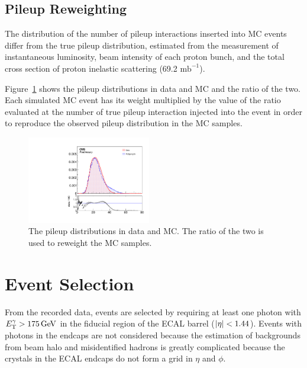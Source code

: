 

\subsection{Pileup Reweighting}
\label{sec:puweight}

The distribution of the number of pileup interactions inserted into MC events differ from the true pileup distribution, estimated from the measurement of instantaneous luminosity, beam intensity of each proton bunch, and the total cross section of proton inelastic scattering (69.2 $\textrm{mb}^{-1}$). 

Figure~\ref{fig:pudist} shows the pileup distributions in data and MC and the ratio of the two. 
Each simulated MC event has its weight multiplied by the value of the ratio evaluated at the number of true pileup interaction injected into the event in order to reproduce the observed pileup distribution in the MC samples. 

\begin{figure}[htbp]
  \centering
  \includegraphics[width=0.48\textwidth]{Analysis/Figures/PUMoriond17.pdf}
  \caption{
    The pileup distributions in data and MC.
    The ratio of the two is used to reweight the MC samples.
  }
  \label{fig:pudist}
\end{figure}

\section{Event Selection}
\label{sec:event_selection}

From the recorded data, events are selected by requiring at least one photon with $E_{\mathrm{T}}^{\gamma} > 175\,\text{Ge\hspace{-.08em}V}$ in the fiducial region of the ECAL barrel ($\lvert \eta \rvert < 1.44$).
Events with photons in the endcaps are not considered because the estimation of backgrounds from beam halo and misidentified hadrons is greatly complicated because the crystals in the ECAL endcaps do not form a grid in $\eta$ and $\phi$.

